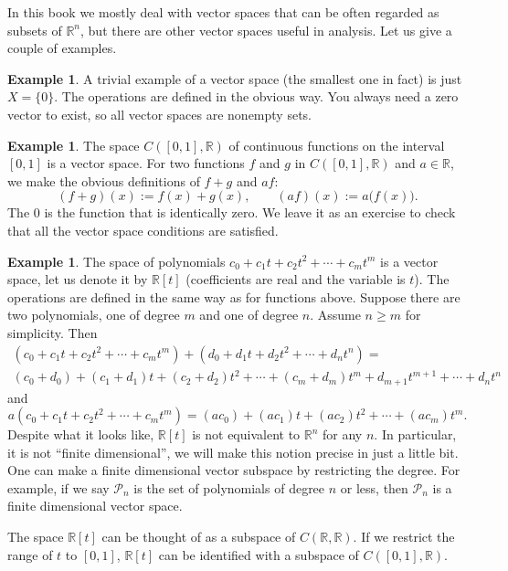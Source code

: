 \documentclass[12pt]{book}
\newcommand{\R}{{\mathbb{R}}}
\newcommand{\sP}{{\mathcal{P}}}
\theoremstyle{plain}
\theoremstyle{remark}
\theoremstyle{definition}
\theoremstyle{exercise}
\theoremstyle{example}
\newtheorem{example}[thm]{Example}
\begin{document}
In this book we mostly deal with vector spaces that can be often regarded as
subsets of $\R^n$, but there are other vector spaces useful in
analysis.  Let us give a couple of examples.

\begin{example}
A trivial example of a vector space (the smallest one in fact) is just
$X = \{ 0 \}$.  The operations are defined in the obvious way.  You always
need a zero vector to exist, so all vector spaces are nonempty sets.
\end{example}

\begin{example}
The space $C([0,1],\R)$ of continuous functions on the interval $[0,1]$
is a vector space.  For two functions $f$ and $g$ in $C([0,1],\R)$ and
$a \in \R$, we make the obvious definitions of $f+g$ and $af$:
\begin{equation*}
(f+g)(x) := f(x) + g(x), \qquad (af) (x) := a\bigl(f(x)\bigr) .
\end{equation*}
The 0 is the function that is identically zero.  We leave it as an exercise
to check that all the vector space conditions are satisfied.
\end{example}

\begin{example}
The space of polynomials $c_0 + c_1 t + c_2 t^2 + \cdots + c_m t^m$
is a vector space, let us denote it by $\R[t]$ (coefficients are real and
the variable is $t$).  The operations are defined in the same way as for
functions above.
Suppose there are
two polynomials, one of degree $m$ and one of degree $n$.  Assume $n
\geq m$ for simplicity.  Then
\begin{multline*}
(c_0 + c_1 t + c_2 t^2 + \cdots + c_m t^m)
+
(d_0 + d_1 t + d_2 t^2 + \cdots + d_n t^n)
= \\
(c_0+d_0) + (c_1+d_1) t + (c_2 + d_2) t^2 + \cdots + (c_m+d_m) t^m
+ d_{m+1} t^{m+1} + \cdots + d_n t^n
\end{multline*}
and
\begin{equation*}
a(c_0 + c_1 t + c_2 t^2 + \cdots + c_m t^m)
=
(ac_0) + (ac_1) t + (ac_2) t^2 + \cdots + (ac_m) t^m  .
\end{equation*}
Despite what it looks like, $\R[t]$ is not equivalent to $\R^n$ for any $n$.  In
particular, it is not ``finite dimensional'', we will make this notion
precise in just a little bit.  One can make a finite
dimensional vector subspace by restricting the degree.  For example,
if we say $\sP_n$ is the set of polynomials of degree $n$ or less,
then $\sP_n$ is a finite dimensional vector space.

The space $\R[t]$ can be thought of as a subspace of $C(\R,\R)$.  If we
restrict the range of $t$ to $[0,1]$, $\R[t]$ can be identified with
a subspace of $C([0,1],\R)$.
\end{example}
\end{document}
